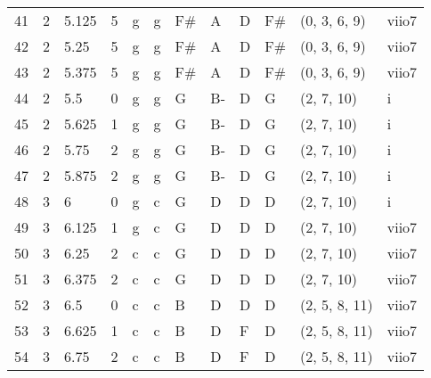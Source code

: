 \begin{tabular}{llllllllllll}
41  & 2       & 5.125  & 5               & g          & g              & F#     & A       & D      & F#        & (0, 3, 6, 9)     & viio7          \\
42  & 2       & 5.25   & 5               & g          & g              & F#     & A       & D      & F#        & (0, 3, 6, 9)     & viio7          \\
43  & 2       & 5.375  & 5               & g          & g              & F#     & A       & D      & F#        & (0, 3, 6, 9)     & viio7          \\
44  & 2       & 5.5    & 0               & g          & g              & G      & B-      & D      & G         & (2, 7, 10)       & i              \\
45  & 2       & 5.625  & 1               & g          & g              & G      & B-      & D      & G         & (2, 7, 10)       & i              \\
46  & 2       & 5.75   & 2               & g          & g              & G      & B-      & D      & G         & (2, 7, 10)       & i              \\
47  & 2       & 5.875  & 2               & g          & g              & G      & B-      & D      & G         & (2, 7, 10)       & i              \\
48  & 3       & 6      & 0               & g          & c              & G      & D       & D      & D         & (2, 7, 10)       & i              \\
49  & 3       & 6.125  & 1               & g          & c              & G      & D       & D      & D         & (2, 7, 10)       & viio7          \\
50  & 3       & 6.25   & 2               & c          & c              & G      & D       & D      & D         & (2, 7, 10)       & viio7          \\
51  & 3       & 6.375  & 2               & c          & c              & G      & D       & D      & D         & (2, 7, 10)       & viio7          \\
52  & 3       & 6.5    & 0               & c          & c              & B      & D       & D      & D         & (2, 5, 8, 11)    & viio7          \\
53  & 3       & 6.625  & 1               & c          & c              & B      & D       & F      & D         & (2, 5, 8, 11)    & viio7          \\
54  & 3       & 6.75   & 2               & c          & c              & B      & D       & F      & D         & (2, 5, 8, 11)    & viio7          \\

\end{tabular}
